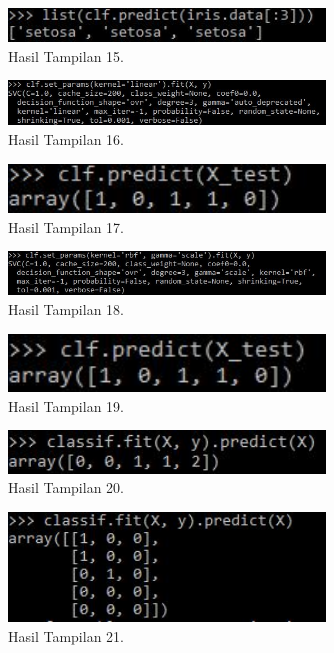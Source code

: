 \begin{figure}[ht]\centerline{\includegraphics[width=0.75\textwidth]{figures/huda/24.JPG}}\caption{Hasil Tampilan 15.}\end{figure}
\begin{figure}[ht]\centerline{\includegraphics[width=0.75\textwidth]{figures/huda/25.JPG}}\caption{Hasil Tampilan 16.}\end{figure}
\begin{figure}[ht]\centerline{\includegraphics[width=0.75\textwidth]{figures/huda/26.JPG}}\caption{Hasil Tampilan 17.}\end{figure}
\begin{figure}[ht]\centerline{\includegraphics[width=0.75\textwidth]{figures/huda/27.JPG}}\caption{Hasil Tampilan 18.}\end{figure}
\begin{figure}[ht]\centerline{\includegraphics[width=0.75\textwidth]{figures/huda/28.JPG}}\caption{Hasil Tampilan 19.}\end{figure}
\begin{figure}[ht]\centerline{\includegraphics[width=0.75\textwidth]{figures/huda/29.JPG}}\caption{Hasil Tampilan 20.}\end{figure}
\begin{figure}[ht]\centerline{\includegraphics[width=0.75\textwidth]{figures/huda/30.JPG}}\caption{Hasil Tampilan 21.}\end{figure}
